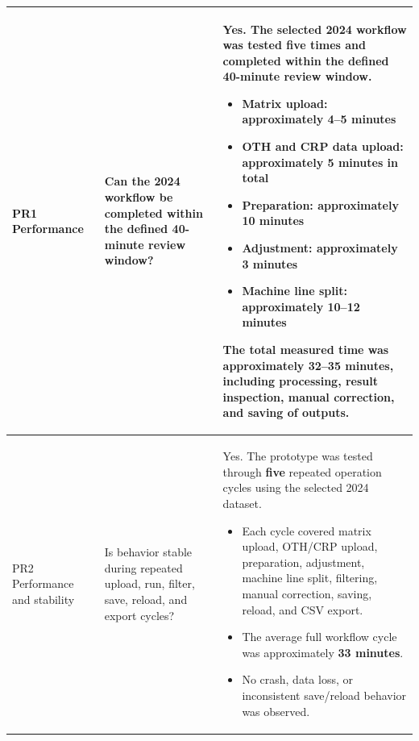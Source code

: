 \begin{longtable}{|>{\raggedright\arraybackslash}p{2.2cm}|>{\raggedright\arraybackslash}p{3.0cm}|>{\raggedright\arraybackslash}p{5.7cm}|}
PR1 Performance & Can the 2024 workflow be completed within the defined 40-minute review window? & 
Yes. The selected 2024 workflow was tested \textbf{five} times and completed within the defined \textbf{40-minute} review window.
\begin{itemize}[leftmargin=*, nosep]
    \item Matrix upload: approximately \textbf{4--5 minutes}
    \item OTH and CRP data upload: approximately \textbf{5 minutes in total}
    \item Preparation: approximately \textbf{10 minutes}
    \item Adjustment: approximately \textbf{3 minutes}
    \item Machine line split: approximately \textbf{10--12 minutes}
\end{itemize}
The total measured time was approximately \textbf{32--35 minutes}, including processing, result inspection, manual correction, and saving of outputs.
\\
\hline

PR2 Performance and stability & Is behavior stable during repeated upload, run, filter, save, reload, and export cycles? & 
Yes. The prototype was tested through \textbf{five} repeated operation cycles using the selected 2024 dataset.
\begin{itemize}[leftmargin=*, nosep]
    \item Each cycle covered matrix upload, OTH/CRP upload, preparation, adjustment, machine line split, filtering, manual correction, saving, reload, and CSV export.
    \item The average full workflow cycle was approximately \textbf{33 minutes}.
    \item No crash, data loss, or inconsistent save/reload behavior was observed.
\end{itemize}
\\
\hline

\end{longtable}



